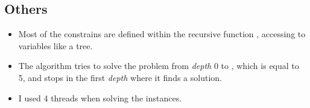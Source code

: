 \documentclass[letterpaper,10pt]{article}
\begin{document}
\subsection{Others}
\begin{itemize}
    \item Most of the constrains are defined within the recursive function , accessing to variables like a tree.
    \item The algorithm tries to solve the problem from \textit{depth} 0 to , which is equal to 5, and stops in the first \textit{depth} where it finds a solution. 
    \item I used 4 threads when solving the instances.
\end{itemize}
\end{document}
